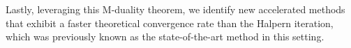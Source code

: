 \documentclass[pdflatex,sn-mathphys-num]{sn-jnl}%
\newcommand{\cB}{\mathcal{B}}
\newcommand{\opT}{{\varmathbb{T}}}
\theoremstyle{thmstyleone}%
\theoremstyle{thmstyletwo}%
\theoremstyle{thmstylethree}%
\begin{document}
Lastly, leveraging this M-duality theorem, we identify new accelerated methods that  exhibit a faster theoretical convergence rate than the Halpern iteration, which was previously known as the state-of-the-art method in this setting.








\end{document}

